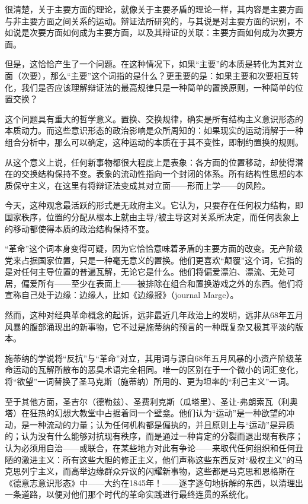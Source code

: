 \documentclass[fontset=fandol, a4paper, 12pt, twoside]{ctexart}
\begin{document}
很清楚，关于主要方面的理论，就像关于主要矛盾的理论一样，其内容是主要方面与非主要方面之间关系的运动。辩证法所研究的，与其说是对主要方面的识别，不如说是次要方面如何成为主要方面，以及其辩证的关联：主要方面如何成为次要方面。

但是，这恰恰产生了一个问题。在这种情况下，如果“主要”的本质是转化为其对立面（次要），那么“主要”这个词指的是什么？更重要的是：如果主要和次要相互转化，我们是否应该理解辩证法的最高规律只是一种简单的置换原则，一种简单的位置交换？

这个问题具有重大的哲学意义。置换、交换规律，确实是所有结构主义意识形态的本质动力。而这些意识形态的政治影响是众所周知的：如果现实的运动消解于一种组合分析中，那么可以确定，这种运动的本质在于其不变性，即制约置换的规则。

从这个意义上说，任何新事物都很大程度上是表象：各方面的位置移动，却使得潜在的交换结构保持不变。表象的流动性指向一个封闭的体系。所有结构性思想的本质保守主义，在这里有将辩证法变成其对立面——形而上学——的风险。

今天，这种观念最活跃的形式是无政府主义。它认为，只要存在任何权力结构，即国家秩序，位置的分配从根本上就由主导/被主导这对关系所决定，而任何表象上的移动都使得本质的政治结构保持不变。

“革命”这个词本身变得可疑，因为它恰恰意味着矛盾的主要方面的改变。无产阶级党来占据国家位置，只是一种毫无意义的置换。他们更喜欢“颠覆”这个词，它指的是对任何主导位置的普遍瓦解，无论它是什么。他们将偏爱漂泊、漂流、无处可居，偏爱所有——至少在表面上——被排除在组合和置换游戏之外的东西。他们将宣称自己处于边缘：边缘人，比如《边缘报》（journal Marge）。

然而，这种对经典革命概念的起诉，远非最近几年政治上的发明，远非从68年五月风暴的腹部涌现出的新事物，它不过是施蒂纳的预言的一种既复杂又极其平淡的版本。

施蒂纳的学说将“反抗”与“革命”对立，其用词与源自68年五月风暴的小资产阶级革命运动的瓦解所散布的恶臭术语完全相同。唯一的区别在于一个微小的词汇变化，将“欲望”一词替换了圣马克斯（施蒂纳）所用的、更为坦率的“利己主义”一词。

至于其他方面，圣吉尔（德勒兹）、圣费利克斯（瓜塔里）、圣让-弗朗索瓦（利奥塔）在狂热的幻想大教堂中占据着同一个壁龛。他们认为“运动”是一种欲望的冲动，是一种流动的力量；认为任何机构都是偏执的，并且原则上与“运动”是异质的；认为没有什么能够对抗现有秩序，而是通过一种肯定的分裂而退出现有秩序；认为必须用自治——或联合，在某些地方对此有争论——来取代任何组织和任何丑陋的激进主义：所有这些大胆的修正主义，他们声称这些东西反对“极权主义”的马克思列宁主义，而高举边缘群众异议的闪耀新事物，这些都是马克思和恩格斯在《德意志意识形态》中——大约在1845年！——逐字逐句地拆解的东西，以清理出一条道路，以便对他们那个时代的革命实践进行最终连贯的系统化。
\end{document}
